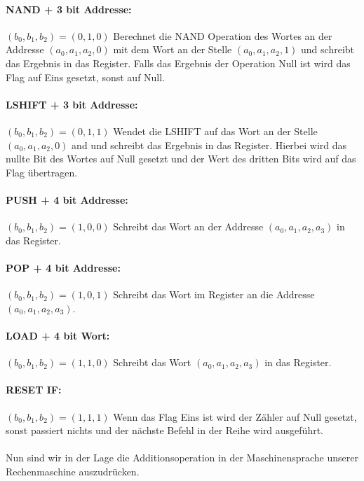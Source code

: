 \documentclass[11pt,a4paper,leqno]{report}
\numberwithin{equation}{chapter}
\begin{document}
\paragraph{NAND + 3 bit Addresse:} $(b_0, b_1, b_2) = (0, 1, 0)$ Berechnet die NAND Operation des Wortes an der Addresse $(a_0, a_1, a_2, 0)$ mit dem Wort an der Stelle $(a_0, a_1, a_2, 1)$ und schreibt das Ergebnis in das Register. Falls das Ergebnis der Operation Null ist wird das Flag auf Eins gesetzt, sonst auf Null.
\paragraph{LSHIFT + 3 bit Addresse:} $(b_0, b_1, b_2) = (0, 1, 1)$ Wendet die LSHIFT auf das Wort an der Stelle $(a_0, a_1, a_2, 0)$ and und schreibt das Ergebnis in das Register. Hierbei wird das nullte Bit des Wortes auf Null gesetzt und der Wert des dritten Bits wird auf das Flag \"ubertragen.
\paragraph{PUSH + 4 bit Addresse:} $(b_0, b_1, b_2) = (1, 0, 0)$ Schreibt das Wort an der Addresse $(a_0, a_1, a_2, a_3)$ in das Register.
\paragraph{POP + 4 bit Addresse:} $(b_0, b_1, b_2) = (1, 0, 1)$ Schreibt das Wort im Register an die Addresse $(a_0, a_1, a_2, a_3)$.
\paragraph{LOAD + 4 bit Wort:} $(b_0, b_1, b_2) = (1, 1, 0)$ Schreibt das Wort $(a_0, a_1, a_2, a_3)$ in das Register.
\paragraph{RESET IF:} $(b_0, b_1, b_2) = (1, 1, 1)$ Wenn das Flag Eins ist wird der Z\"ahler auf Null gesetzt, sonst passiert nichts und der n\"achste Befehl in der Reihe wird ausgef\"uhrt.
\\
\\
Nun sind wir in der Lage die Additionsoperation in der Maschinensprache unserer Rechenmaschine auszudr\"ucken.
\end{document}
